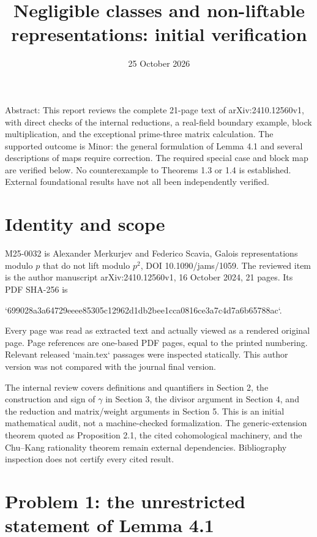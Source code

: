 \documentclass[10pt]{article}
\title{Negligible classes and non-liftable representations: initial verification}
\author{}
\date{25 October 2026}
\begin{document}
\maketitle
Abstract: This report reviews the complete 21-page text of arXiv:2410.12560v1, with direct checks of the internal reductions, a real-field boundary example, block multiplication, and the exceptional prime-three matrix calculation. The supported outcome is Minor: the general formulation of Lemma 4.1 and several descriptions of maps require correction. The required special case and block map are verified below. No counterexample to Theorems 1.3 or 1.4 is established. External foundational results have not all been independently verified.\par
\section*{Identity and scope}
M25-0032 is Alexander Merkurjev and Federico Scavia, Galois representations modulo \(p\) that do not lift modulo \(p^2\), DOI 10.1090/jams/1059. The reviewed item is the author manuscript arXiv:2410.12560v1, 16 October 2024, 21 pages. Its PDF SHA-256 is\par
`699028a3a64729eeee85305c12962d1db2bee1cca0816ce3a7c4d7a6b65788ac`.\par
Every page was read as extracted text and actually viewed as a rendered original page. Page references are one-based PDF pages, equal to the printed numbering. Relevant released `main.tex` passages were inspected statically. This author version was not compared with the journal final version.\par
The internal review covers definitions and quantifiers in Section 2, the construction and sign of \(\gamma\) in Section 3, the divisor argument in Section 4, and the reduction and matrix/weight arguments in Section 5. This is an initial mathematical audit, not a machine-checked formalization. The generic-extension theorem quoted as Proposition 2.1, the cited cohomological machinery, and the Chu–Kang rationality theorem remain external dependencies. Bibliography inspection does not certify every cited result.\par
\section*{Problem 1: the unrestricted statement of Lemma 4.1}
\end{document}
